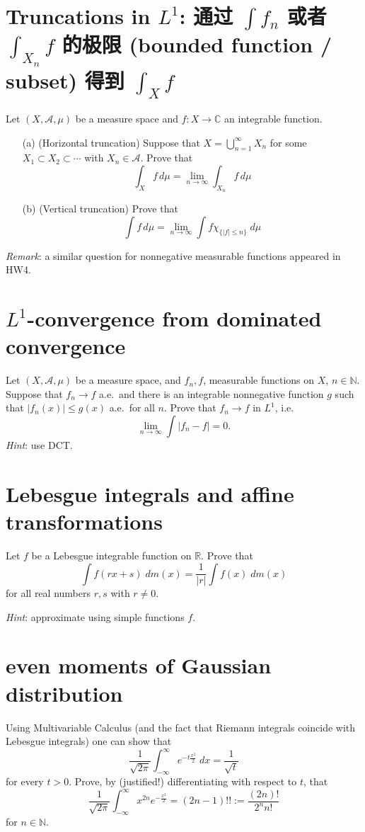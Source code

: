 \documentclass[lang=cn,11pt]{elegantbook}
\begin{document}
\section{Truncations in $L^1$: 通过 $\int f_n$ 或者 $\int_{X_n} f$ 的极限 (bounded function / subset) 得到 $\int_X f$}
Let $(X,\mathcal{A},\mu)$ be a measure space and $f\colon X\to\mathbb{C}$ an integrable function.
\begin{itemize}
\item[(a)] (Horizontal truncation) Suppose that $X=\bigcup_{n=1}^\infty X_n$ for some $X_1\subset X_2\subset \cdots$ 
with $X_n\in \mathcal{A}$. Prove that 
\[
  \int_X f \,d\mu = \lim_{n\to \infty} \int_{X_n} f\,d\mu
\]
\item[(b)] (Vertical truncation) Prove that
\[
  \int f\,d\mu = \lim_{n\to \infty} \int f\chi_{\{|f|\le n\}}\; d\mu
\]
\end{itemize}
\textit{Remark}: a similar question for nonnegative measurable functions appeared in HW4.

\section{$L^1$-convergence from dominated convergence}
Let $(X,\mathcal{A},\mu)$ be a measure space, and $f_n, f$, measurable functions on $X$, $n\in \mathbb{N}$. 
Suppose that $f_n\to f$ a.e.\ and there is an integrable nonnegative function $g$ such that $|f_n(x)|\le g(x)$ a.e.\ for all $n$. Prove that 
$f_n\to f$ in $L^1$, i.e.\
\[
  \lim_{n\to \infty} \int |f_n-f| =0.
\]
\textit{Hint}: use DCT.

\section{Lebesgue integrals and affine transformations}
  Let $f$ be a Lebesgue integrable function on $\mathbb{R}$. 
  Prove that 
  \[
    \int f(rx+s)\; d m(x)=\frac1{|r|}\int f(x)\; d m(x)
  \]
  for all real numbers $r,s$ with $r\ne0$.
  
  \textit{Hint}: approximate using simple functions $f$.


\section{even moments of Gaussian distribution}
    Using Multivariable Calculus (and the fact that Riemann integrals coincide with Lebesgue integrals) one can show that
    \[
      \frac1{\sqrt{2\pi}} \int_{-\infty}^\infty e^{-t\frac{x^2}{2}} \;d x = \frac1{\sqrt{t}}
    \]
    for every $t>0$.
    Prove, by (justified!) differentiating with respect to $t$, that
    \[
      \frac1{\sqrt{2\pi}} \int_{-\infty}^\infty x^{2n} e^{-\frac{x^2}{2}} = (2n-1)!!
      := \frac{(2n)!}{2^n n!}
    \]
    for $n\in \mathbb{N}$.
\end{document}
